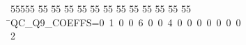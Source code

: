 %
%
\begin{tabbing}
55555 \= 55 \= 55 \= 55 \= 55 \= 55 \= 55 \= 55 \= 55 \= 55 \= 55 \= 55 \= 55 \= \>QC\_Q9\_COEFFS=0\ 1\ 0\ 0\ 6\ 0\ 0\ 4\ 0\ 0\ 0\ 0\ 0\ 0\ 0\\[0pt]
2\>\end{tabbing}
